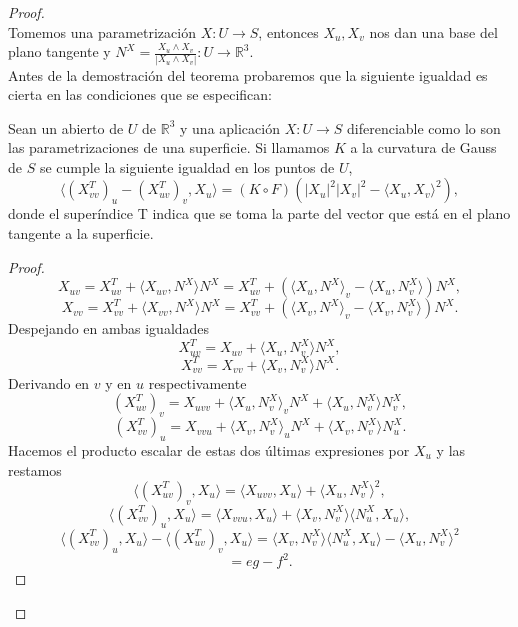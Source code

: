 \begin{proof}
${ }$\\

	Tomemos una parametrización $X : U \to S$, entonces $X_u, X_v$ nos dan una base del plano tangente y $N^X = \frac{X_u \wedge X_v}{|X_u \wedge X_v|} : U \to \mathbb{R}^3$.
	${ }$\\
	
	Antes de la demostración del teorema probaremos que la siguiente igualdad es cierta en las condiciones que se especifican:
	${ }$\\
	
	\begin{lema}
		Sean un abierto de $U$ de $\mathbb{R}^3$ y una aplicación $X : U \to S$ diferenciable como lo son las parametrizaciones de una superficie. Si llamamos $K$ a la curvatura de Gauss de $S$ se cumple la siguiente igualdad en los puntos de $U$,
		\[
			\langle ({X}^{T}_{vv})_u - ({X}^{T}_{uv})_v, X_u \rangle = (K \circ F)(|X_u|^2|X_v|^2 - \langle X_u, X_v \rangle ^2),
		\]
		donde el superíndice T indica que se toma la parte del vector que está en el plano tangente a la superficie.
	\end{lema}
	\begin{proof}
		\[
			X_{uv} = {X}^{T}_{uv} + \langle X_{uv}, N^X \rangle N^X = {X}^{T}_{uv} + (\langle X_u,N^X \rangle_v - \langle X_u, N^{X}_{v} \rangle )N^X,
		\]
		\[
			X_{vv} = X^{T}_{vv} + \langle X_{vv}, N^{X} \rangle N^X = X^{T}_{vv} + (\langle X_v,N^X \rangle _v - \langle X_v, N^{X}_{v}\rangle )N^X.
		\]
		${ }$\\
		
		Despejando en ambas igualdades
		${ }$\\
		\[
			X^{T}_{uv} = X_{uv} + \langle X_u, N^{X}_{v} \rangle N^X,
		\]
		\[
			X^{T}_{vv} = X_{vv} + \langle X_v, N^{X}_{v} \rangle N^X.
		\]
		${ }$\\
		
		Derivando en $v$ y en $u$ respectivamente
		${ }$\\
		\[
			(X^{T}_{uv})_v = X_{uvv} + \langle X_u, N^{X}_{v} \rangle _v N^X + \langle X_u, N^{X}_{v} \rangle N^{X}_{v},
		\]
		\[
			(X^{T}_{vv})_u = X_{vvu} + \langle X_v, N^{X}_{v}\rangle _u N^X + \langle X_v, N^{X}_{v} \rangle N^{X}_{u}.
		\]
		${ }$\\
		
		Hacemos el producto escalar de estas dos últimas expresiones por $X_u$ y las restamos
		${ }$\\
		
		\[
			\langle (X^{T}_{uv})_v, X_u \rangle = \langle X_{uvv}, X_u \rangle + \langle X_u, N^{X}_v \rangle ^2,
		\]
		\[
			\langle (X^{T}_{vv})_u, X_u \rangle = \langle X_{vvu}, X_u \rangle + \langle X_v, N^{X}_{v} \rangle \langle N^{X}_{u}, X_u \rangle ,
		\]
	${ }$\\	
		\[
			\langle (X^{T}_{vv})_u, X_u \rangle - \langle (X^{T}_{uv})_v, X_u \rangle = \langle X_v, N^{X}_{v} \rangle \langle N^{X}_{u}, X_u \rangle - \langle X_u, N^{X}_{v} \rangle ^2
		\]
		\[
			= eg - f^2.
		\]
		${ }$\\
		

\end{proof}
\end{proof}
